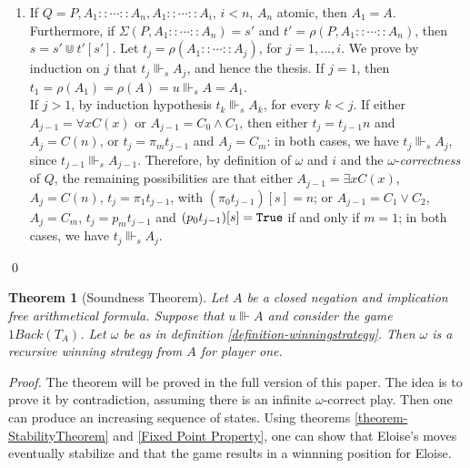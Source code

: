 \documentclass[copyright,creativecommons]{eptcs}
\newcommand{\True}                     { {\tt{True}} }
\newcommand{\proj}                     { {p} }
\newtheorem{theorem}{Theorem}
\begin{document}
{\begin{enumerate}
 \item
 If $Q=P, A_1::\cdots:: A_n, A_1::\cdots:: A_i$, $i<n$, $A_n$ atomic, then $A_1=A$. Furthermore, if $\Sigma(P,A_1::\cdots:: A_n)=s'$
and  $t'=\rho(P,A_1::\cdots::A_n)$, then $s=s'\Cup t'[s']$. Let
$t_j=\rho(A_1::\cdots :: A_j)$, for $j=1,\ldots, i$. We prove by
induction on $j$ that $t_j\Vvdash_s A_j$, and hence the thesis.
If $j=1$, then $t_1=\rho(A_1)=\rho(A)=u\Vvdash_s A=A_1$.\\ If $j>1$,
by induction hypothesis $t_{k}\Vvdash_s A_{k}$, for every $k<j$. If either $A_{j-1}=\forall x
C(x)$ or $A_{j-1}=C_0\wedge C_1$, then
either $t_j=t_{j-1}{n}$ and $A_j=C({n})$, or
$t_j=\pi_mt_{j-1}$ and $A_j=C_m$: in both cases, we have
$t_j\Vvdash_s A_j$, since $t_{j-1}\Vvdash_s A_{j-1}$. Therefore, by definition of $\omega$ and $i$ and the $\omega$-\emph{correctness} of $Q$, the remaining possibilities are that either
$A_{j-1}=\exists x C(x)$, $A_j=
C({n})$, $t_j=\pi_1t_{j-1}$, with $(\pi_0t_{j-1})[s]= {n}$; or
$A_{j-1}=C_1\lor C_2$, $A_j=C_m$, $t_j=\proj_m t_{j-1}$ and
$(\proj_0t_{j-1})[s]=\True$ if and only if $m=1$; in both cases,  we
have $t_j\Vvdash_s A_j$. \end{enumerate}
 \qed
}


\begin{theorem}[Soundness Theorem] Let $A$ be a closed negation and implication free arithmetical formula. Suppose that $u\Vvdash A$ and consider the game
$1Back(T_A)$. Let $\omega$ be as in definition \ref{definition-winningstrategy}. Then $\omega$ is a recursive winning strategy from $A$ for player one. \end{theorem}
\textit{Proof.} The theorem will be proved in the full version of this paper. The idea is to prove it by contradiction, assuming there is an infinite $\omega$-correct play. Then one can produce an increasing sequence of states. Using theorems \ref{theorem-StabilityTheorem} and \ref{Fixed Point Property}, one can show that Eloise's moves eventually stabilize and that the game results in a winnning position for Eloise. 
\end{document}
